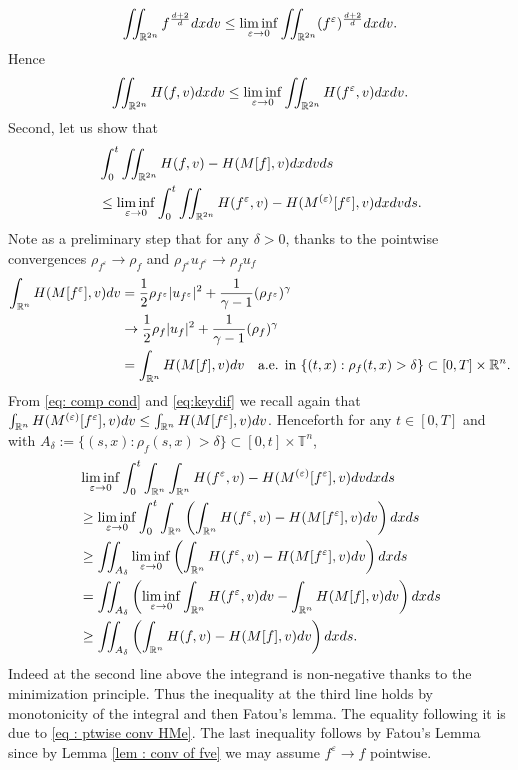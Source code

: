 \documentclass{amsart}
\theoremstyle{plain}
\theoremstyle{remark}
\numberwithin{equation}{section}
\newcommand{\R}{\mathbb{R}}
\newcommand{\T}{\mathbb{T}}
\newcommand{\ve}{\varepsilon}
\newcommand{\dx}{\textnormal{d}x}
\newcommand{\dv}{\textnormal{d}v}
\newcommand{\ds}{\textnormal{d}s}
\newcommand{\lt}{\left}
\newcommand{\rt}{\right}
\newcommand{\intr}{\int_{\R^n}}
\begin{document}
\begin{equation*}
    \iint_{\R^{2n}} f^{\frac{d+2}{d}}\dx\dv \le \liminf_{\ve\to0}\iint_{\R^{2n}} (f^\ve)^{\frac{d+2}{d}}\dx\dv.
\end{equation*}
Hence
\begin{equation}
\label{eq : kin entrop lsc}
    \iint_{\R^{2n}} H(f,v)\dx\dv \le \liminf_{\ve\to0}\iint_{\R^{2n}} H(f^\ve,v)\dx\dv.
\end{equation}
Second, let us show that
\begin{equation}
\label{eq : diss lsc}
\begin{split}
    &\int_0^t \iint_{\R^{2n}} H(f,v)-H(M[f],v) \dx \dv \ds\\
    &\le \liminf_{\ve\to 0} \int_0^t \iint_{\R^{2n}} H(f^\ve,v) - H(M^{(\ve)}[f^\ve],v) \dx \dv \ds.
\end{split}
\end{equation}
Note as a preliminary step that for any $\delta>0$, thanks to the pointwise convergences $\rho_{f^\ve} \to \rho_f$ and $\rho_{f^\ve}u_{f^\ve} \to \rho_f u_f$
\begin{equation}
\label{eq : ptwise conv HMe}
\begin{split}
    \int_{\R^n} H(M[f^\ve],v)\dv &= \frac{1}{2} \rho_{f^\ve} |u_{f^\ve}|^2 + \frac{1}{\gamma-1}(\rho_{f^\ve})^\gamma \\
    &\to \frac{1}{2}\rho_f |u_f|^2 + \frac{1}{\gamma-1}(\rho_f)^\gamma \\
    &= \int_{\R^n} H(M[f],v)\dv \quad\text{a.e. in }\{(t,x):\rho_f(t,x)>\delta\} \subset [0,T]\times \R^n.
    \end{split}
\end{equation}
From \eqref{eq: comp cond} and \eqref{eq:keydif} we recall again that $\int_{\R^n} H(M^{(\ve)}[f^\ve],v)\dv \le \int_{\R^n} H(M[f^\ve],v)\dv$. Henceforth for any $t\in [0,T]$ and with $A_\delta := \{(s,x):\rho_f(s,x)>\delta\}\subset [0,t]\times \T^n$,
{\allowdisplaybreaks
\begin{align*}
    &\liminf_{\ve \to 0} \int_0^t \intr\intr H(f^\ve,v) - H(M^{(\ve)}[f^\ve],v) \dv \dx \ds\\
    &\ge \liminf_{\ve \to 0} \int_0^t \intr\lt(\intr H(f^\ve,v) - H(M[f^\ve],v) \dv\rt) \dx \ds\\
    &\ge \iint_{A_\delta} \liminf_{\ve \to 0} \left( \int_{\R^n} H(f^\ve,v) - H(M[f^\ve],v) \dv \right) \dx \ds \\
    &= \iint_{A_\delta} \left( \liminf_{\ve \to 0} \int_{\R^n} H(f^\ve,v) \dv  - \int_{\R^n} H(M[f],v) \dv \right) \dx \ds  \\
    &\ge \iint_{A_\delta} \left( \int_{\R^n} H(f,v) - H(M[f],v) \dv\right) \dx \ds.
\end{align*}}
Indeed at the second line above the integrand is non-negative thanks to the minimization principle. Thus the inequality at the third line holds by monotonicity of the integral and then Fatou's lemma. The equality following it is due to \eqref{eq : ptwise conv HMe}. The last inequality follows by Fatou's Lemma since by Lemma \ref{lem : conv of fve} we may assume $f^\ve\to f$ pointwise.
\end{document}
